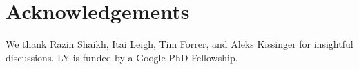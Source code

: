 \section{Acknowledgements}
We thank Razin Shaikh, Itai Leigh, Tim Forrer, and Aleks Kissinger for insightful discussions.
LY is funded by a Google PhD Fellowship.